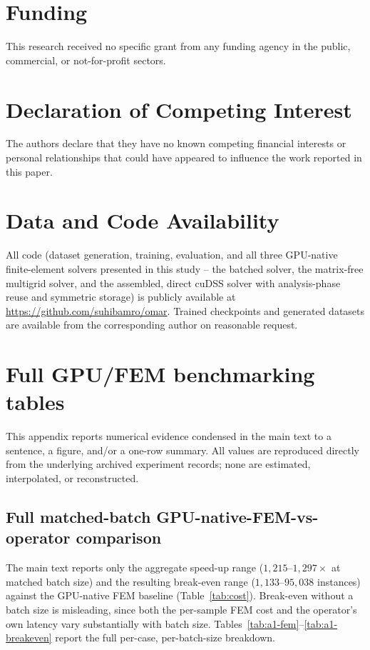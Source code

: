 \documentclass[final,5p,times]{elsarticle}
\begin{document}
\section*{Funding}
This research received no specific grant from any funding agency in the
public, commercial, or not-for-profit sectors.

\section*{Declaration of Competing Interest}
The authors declare that they have no known competing financial
interests or personal relationships that could have appeared to
influence the work reported in this paper.

\section*{Data and Code Availability}
All code (dataset generation, training, evaluation, and all three
GPU-native finite-element solvers presented in this study -- the batched
solver, the matrix-free multigrid solver, and the assembled, direct
cuDSS solver with analysis-phase reuse and symmetric storage) is publicly
available at \url{https://github.com/suhibamro/omar}. Trained checkpoints
and generated datasets are available from the corresponding author on
reasonable request.

\appendix

\onecolumn
\renewcommand{\arraystretch}{0.85}

\section{Full GPU/FEM benchmarking tables}
\label{app:a}
\setcounter{table}{0}
This appendix reports numerical evidence condensed in the main text to a
sentence, a figure, and/or a one-row summary. All values are reproduced
directly from the underlying archived experiment records; none are
estimated, interpolated, or reconstructed.

\subsection{Full matched-batch GPU-native-FEM-vs-operator comparison}
The main text reports only
the aggregate speed-up range ($1{,}215$--$1{,}297\times$ at matched batch
size) and the resulting break-even range ($1{,}133$--$95{,}038$
instances) against the GPU-native FEM baseline (Table~\ref{tab:cost}).
Break-even without a batch size is misleading, since both the per-sample
FEM cost and the operator's own latency vary substantially with batch
size. Tables~\ref{tab:a1-fem}--\ref{tab:a1-breakeven} report the full
per-case, per-batch-size breakdown.
\end{document}
